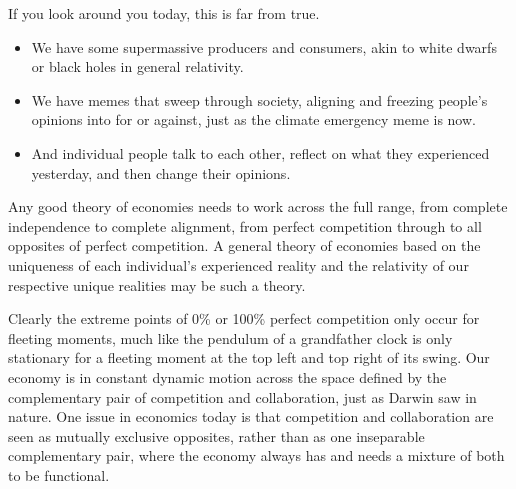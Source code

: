 If you look around you today, this is far from true. 


\begin{itemize}
\item We have some supermassive producers and consumers, akin to white dwarfs or black holes  in general relativity.  
\item We have memes that sweep through society, aligning and freezing people's opinions into for or against, just as the climate emergency  meme is now. 
\item And individual people talk to each other, reflect on what they experienced yesterday, and then change their opinions.
\end{itemize}


Any good theory of economies needs to work across the full range, from complete independence to complete alignment, from perfect competition through to all opposites of perfect competition. A general theory of economies based on the uniqueness of each individual’s experienced reality and the relativity of our respective unique realities may be such a theory.


Clearly the extreme points of 0\% or 100\% perfect competition  only occur for fleeting moments, much like the pendulum of a grandfather clock is only stationary for a fleeting moment at the top left and top right of its swing. Our economy is in constant dynamic motion across the space defined by the complementary pair of competition  and collaboration, just as Darwin  saw in nature. One issue in economics today is that competition and collaboration are seen as mutually exclusive opposites, rather than as one inseparable complementary pair,  where the economy  always has and needs a mixture of both to be functional.


